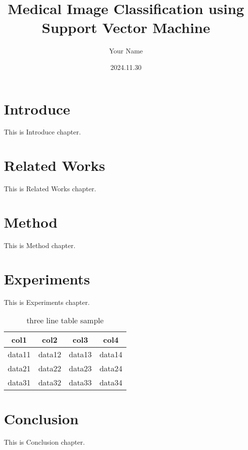 \documentclass[twocolumn]{article}
\title{Medical Image Classification using Support Vector Machine}
\author{Your Name}
\date{2024.11.30}
\begin{document}

\section{Introduce}
This is Introduce chapter.

\section{Related Works}
This is Related Works chapter.

\section{Method}
This is Method chapter.

\section{Experiments}
This is Experiments chapter.
\begin{table}[h]
    \centering
    \caption{three line table sample}
    \begin{tabular}{cccc}
    \toprule
    col1 & col2 & col3 & col4 \\
    \midrule
    data11 & data12 & data13 & data14 \\
    data21 & data22 & data23 & data24 \\
    data31 & data32 & data33 & data34 \\
    \bottomrule
    \end{tabular}
    \end{table}

\section{Conclusion}
This is Conclusion chapter.
\end{document}
